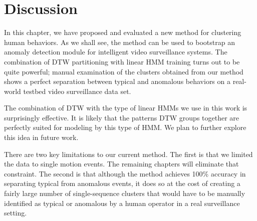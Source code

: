 \section{Discussion}
\label{sec:clustering-discussion}

In this chapter, we have proposed and evaluated a new method for
clustering human behaviors.  As we shall see, the method can be used
to bootstrap an anomaly detection module for intelligent video
surveillance systems.  The combination of DTW partitioning with linear
HMM training turns out to be quite powerful; manual examination of the
clusters obtained from our method shows a perfect separation between
typical and anomalous behaviors on a real-world testbed video
surveillance data set.

The combination of DTW with the type of linear HMMs we use in this
work is surprisingly effective. It is likely that the patterns DTW
groups together are perfectly suited for modeling by this type of HMM.
We plan to further explore this idea in future work.

There are two key limitations to our current method. The first is that
we limited the data to single motion events. The remaining chapters
will eliminate that constraint. The second is that although the method
achieves 100\% accuracy in separating typical from anomalous events,
it does so at the cost of creating a fairly large number of
single-sequence clusters that would have to be manually identified as
typical or anomalous by a human operator in a real surveillance
setting.

\FloatBarrier

